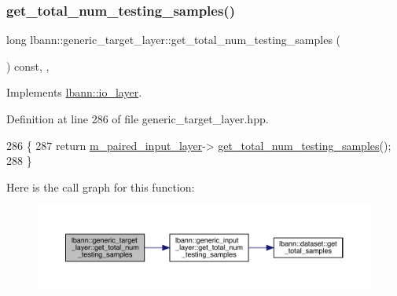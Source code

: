 \subsubsection{\texorpdfstring{get\+\_\+total\+\_\+num\+\_\+testing\+\_\+samples()}{get\_total\_num\_testing\_samples()}}
{\footnotesize\ttfamily long lbann\+::generic\+\_\+target\+\_\+layer\+::get\+\_\+total\+\_\+num\+\_\+testing\+\_\+samples (\begin{DoxyParamCaption}{ }\end{DoxyParamCaption}) const\hspace{0.3cm}{\ttfamily [inline]}, {\ttfamily [override]}, {\ttfamily [virtual]}}



Implements \hyperlink{classlbann_1_1io__layer_a8c1575ad108ffbdf2a553a44509211e6}{lbann\+::io\+\_\+layer}.



Definition at line 286 of file generic\+\_\+target\+\_\+layer.\+hpp.


\begin{DoxyCode}
286                                                       \{
287     \textcolor{keywordflow}{return} \hyperlink{classlbann_1_1generic__target__layer_a84da1260e9feb4fbc3e6f2315e4cab4b}{m\_paired\_input\_layer}->
      \hyperlink{classlbann_1_1generic__input__layer_ab5b5318cf000fbdaf35a3545335b60b2}{get\_total\_num\_testing\_samples}();
288   \}
\end{DoxyCode}
Here is the call graph for this function\+:\nopagebreak
\begin{figure}[H]
\begin{center}
\leavevmode
\includegraphics[width=350pt]{classlbann_1_1generic__target__layer_af41c92981e0a1731d3dee9b1b49201db_cgraph}
\end{center}
\end{figure}
\mbox{\label{classlbann_1_1generic__target__layer_a857306496e1c55cb15cd81301edb010f}} 
